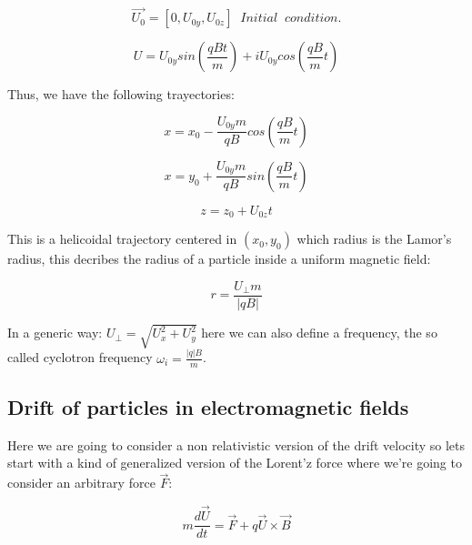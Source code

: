 \documentclass[spanish,notitlepage,letterpaper,11pt]{article} %
\numberwithin{equation}{subsection}
\begin{document}
        \begin{equation}
            \Vec{U_0}= [0,U_{0y},U_{0z}] \;\;Initial\;\;condition.
        \end{equation}

        \begin{equation*}
            U = U_{0y}sin\left(\frac{qBt}{m} \right) + iU_{0y}cos\left(\frac{qB}{m}t\right)
        \end{equation*}

        Thus, we have the following trayectories:

        \begin{equation}\label{eq:mvx}
            x = x_0 - \frac{U_{0y}m}{qB}cos\left(\frac{qB}{m}t\right)
        \end{equation}

        \begin{equation}\label{eq:mvy}
            x = y_0 + \frac{U_{0y}m}{qB}sin\left(\frac{qB}{m}t\right)
        \end{equation}

        \begin{equation}
            z = z_0 + U_{0z}t
        \end{equation}

        This is a helicoidal trajectory centered in $(x_0,y_0)$ which radius is the Lamor's radius, this decribes the radius of a particle inside a uniform magnetic field:

        \begin{equation}\label{eq:LarmorRad}
            r = \frac{U_{\perp}m}{|qB|}
        \end{equation}

        In a generic way: $U_{\perp} = \sqrt{U_x^2 + U_y^2}$ here we can also define a frequency, the so called cyclotron frequency $\omega_i = \frac{|q|B}{m}$.

        \subsection{Drift of particles in electromagnetic fields}

            Here we are going to consider a non relativistic version of the drift velocity so lets start with a kind of generalized version of the Lorent'z force where we're going to consider an arbitrary force $\Vec{F}$:

            \begin{equation}
                m\frac{d\Vec{U}}{dt} = \Vec{F} + q\Vec{U}\times\Vec{B}
            \end{equation}
\end{document}
